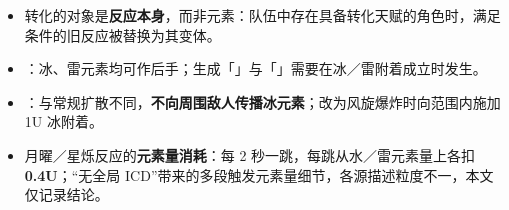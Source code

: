 \begin{itemize}
\item 转化的对象是\textbf{反应本身}，而非元素：队伍中存在具备转化天赋的角色时，满足条件的旧反应被替换为其变体。
\item \textbf{}：冰、雷元素均可作后手；生成「」与「」需要在冰／雷附着成立时发生。
\item \textbf{}：与常规扩散不同，\textbf{不向周围敌人传播冰元素}；改为风旋爆炸时向范围内施加 1U 冰附着。
\item 月曜／星烁反应的\textbf{元素量消耗}：每 2 秒一跳，每跳从水／雷元素量上各扣 \textbf{0.4U}；“无全局 ICD”带来的多段触发元素量细节，各源描述粒度不一，本文仅记录结论。
\end{itemize}
